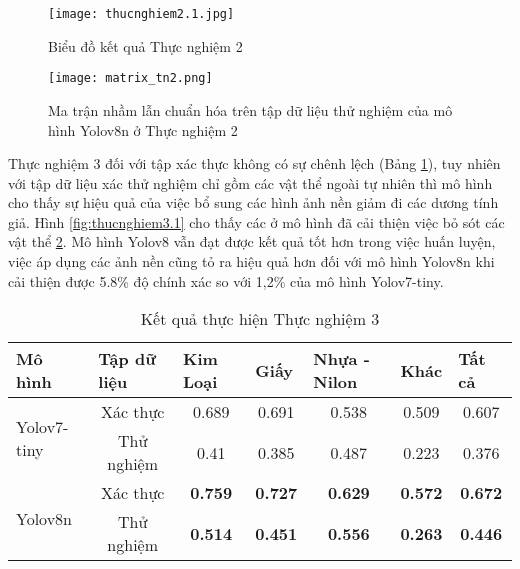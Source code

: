 \documentclass[../the.tex]{subfiles}
\begin{document}
\begin{figure}[H]
    \centering
    \texttt{[image: thucnghiem2.1.jpg]}
    \caption{Biểu đồ kết quả Thực nghiệm 2}
    \label{fig:thucnghiem2}
\end{figure}

\begin{figure}[H]
    \centering
    \texttt{[image: matrix\_tn2.png]}
    \caption{Ma trận nhầm lẫn chuẩn hóa trên tập dữ liệu thử nghiệm của mô hình Yolov8n ở Thực nghiệm 2}
    \label{fig:thucnghiem2.1}
\end{figure}

{\fontsize{13}{12} \selectfont
Thực nghiệm 3 đối với tập xác thực không có sự chênh lệch (Bảng \ref{tab:thucnghiem3.1}), tuy nhiên với tập dữ liệu xác thử nghiệm chỉ gồm các vật thể ngoài tự nhiên thì mô hình
cho thấy sự hiệu quả của việc bổ sung các hình ảnh nền giảm đi các dương tính giả. Hình \ref{fig:thucnghiem3.1} cho thấy các ở mô hình đã cải thiện việc bỏ sót các vật thể \ref{fig:thucnghiem2.1}.
Mô hình Yolov8 vẫn đạt được kết quả tốt hơn trong việc huấn luyện, việc áp dụng các ảnh nền cũng tỏ ra hiệu quả hơn đối với mô hình Yolov8n khi cải thiện được 5.8\% độ chính xác so với 1,2\% của mô hình Yolov7-tiny.
}

\begin{table}[h!]
    \centering
    \caption{Kết quả thực hiện Thực nghiệm 3}
    \begin{tabular}{|l|c|c|c|c|c|c|}
        \hline
        \textbf{Mô hình}             & \multicolumn{1}{l|}{\textbf{Tập dữ liệu}} & \multicolumn{1}{l|}{\textbf{Kim Loại}} & \multicolumn{1}{l|}{\textbf{Giấy}} & \multicolumn{1}{l|}{\textbf{Nhựa - Nilon}} & \multicolumn{1}{l|}{\textbf{Khác}} & \multicolumn{1}{l|}{\textbf{Tất cả}} \\ \hline
        \multirow{2}{*}{Yolov7-tiny} & Xác thực                                  & 0.689                                  & 0.691                              & 0.538                                      & 0.509                              & 0.607                                \\ \cline{2-7}
                                     & Thử nghiệm                                & 0.41                                   & 0.385                              & 0.487                                      & 0.223                              & 0.376                                \\ \hline
        \multirow{2}{*}{Yolov8n}     & Xác thực                                  & \textbf{0.759}                         & \textbf{0.727}                     & \textbf{0.629}                             & \textbf{0.572}                     & \textbf{0.672}                       \\ \cline{2-7}
                                     & Thử nghiệm                                & \textbf{0.514}                         & \textbf{0.451}                     & \textbf{0.556}                             & \textbf{0.263}                     & \textbf{0.446}                       \\ \hline
    \end{tabular}
    \label{tab:thucnghiem3.1}
\end{table}
\end{document}
